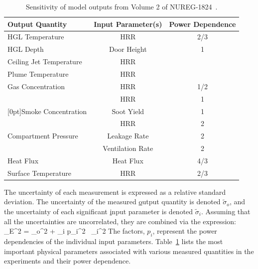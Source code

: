 \begin{table}[t]
\caption{Sensitivity of model outputs from Volume 2 of NUREG-1824~\cite{NUREG_1824}. }
\begin{center}
\begin{tabular}{|l|c|c|}
\hline
Output Quantity                                 & Input Parameter(s)    & Power Dependence \\ \hline \hline
HGL Temperature                                 & HRR                   & 2/3    \\ \hline
HGL Depth                                       & Door Height           & 1      \\ \hline
Ceiling Jet Temperature                         & HRR                   &        \\ \hline
Plume Temperature                               & HRR                   &        \\ \hline
Gas Concentration                               & HRR                   & 1/2    \\ \hline
                                                & HRR                   & 1      \\ \cline{2-3}
\raisebox{1.5ex}[0pt]{Smoke Concentration}      & Soot Yield            & 1      \\ \hline
                                                & HRR                   & 2      \\ \cline{2-3}
Compartment Pressure                            & Leakage Rate          & 2      \\ \cline{2-3}
                                                & Ventilation Rate      & 2      \\ \hline
Heat Flux                                       & Heat Flux             & 4/3    \\ \hline
Surface Temperature                             & HRR                   & 2/3    \\ \hline
\end{tabular}
\end{center}
\label{Parameter_Uncertainty}
\end{table}

The uncertainty of each measurement is expressed as a relative standard deviation. The uncertainty of the measured
\underline{o}utput quantity is denoted $\widetilde{\sigma}_o$, and the uncertainty of each
significant \underline{i}nput parameter is denoted $\widetilde{\sigma}_i$.
Assuming that all the uncertainties are uncorrelated, they are combined via the expression:
\be
   \widetilde{\sigma}_E^2 = \widetilde{\sigma}_o^2 + \sum_i p_i^2 \, \widetilde{\sigma}_i^2  \label{comb_unc}
\ee
The factors, $p_i$, represent the power dependencies of the individual input parameters.
Table~\ref{Parameter_Uncertainty} lists the most important physical parameters associated with various
measured quantities in the experiments and their power dependence.


